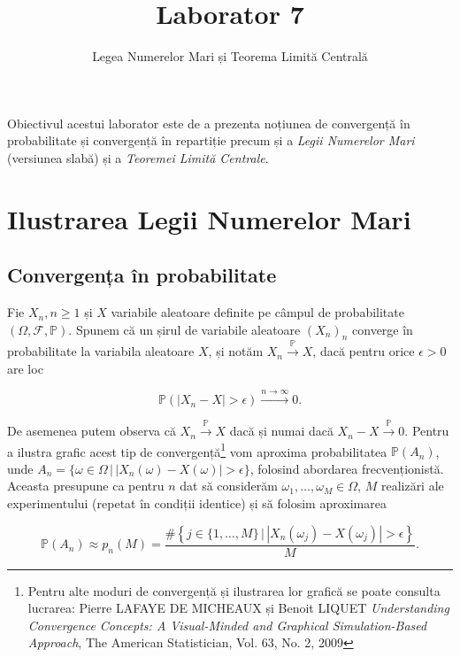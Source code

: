 \documentclass[]{article}
\title{Laborator 7}
\subtitle{Legea Numerelor Mari și Teorema Limită Centrală}
\author{}
\date{}
\let\rmarkdownfootnote\footnote%
\def\footnote{\protect\rmarkdownfootnote}
\begin{document}
\maketitle

\thispagestyle{fancy}

Obiectivul acestui laborator este de a prezenta noțiunea de convergență
în probabilitate și convergență în repartiție precum și a \emph{Legii
Numerelor Mari} (versiunea slabă) și a \emph{Teoremei Limită Centrale}.

\section{Ilustrarea Legii Numerelor
Mari}\label{ilustrarea-legii-numerelor-mari}

\subsection{Convergența în
probabilitate}\label{convergenta-in-probabilitate}

Fie \(X_n, n\geq 1\) și \(X\) variabile aleatoare definite pe câmpul de
probabilitate \((\Omega, \mathcal{F}, \mathbb{P})\). Spunem că un șirul
de variabile aleatoare \((X_n)_n\) converge în probabilitate la
variabila aleatoare \(X\), și notăm \(X_n\overset{\mathbb{P}}{\to}X\),
dacă pentru orice \(\epsilon>0\) are loc

\[
  \mathbb{P}\left(\left|X_{n} - X\right| > \epsilon\right) \overset{n\to\infty}{\longrightarrow} 0. 
\]

De asemenea putem observa că \(X_n\overset{\mathbb{P}}{\to}X\) dacă și
numai dacă \(X_n-X\overset{\mathbb{P}}{\to}0\). Pentru a ilustra grafic
acest tip de convergență\footnote{Pentru alte moduri de convergență și
  ilustrarea lor grafică se poate consulta lucrarea: Pierre LAFAYE DE
  MICHEAUX și Benoit LIQUET \emph{Understanding Convergence Concepts: A
  Visual-Minded and Graphical Simulation-Based Approach}, The American
  Statistician, Vol. 63, No. 2, 2009} vom aproxima probabilitatea
\(\mathbb{P}(A_n)\), unde
\(A_n = \{\omega\in\Omega\,|\,\left|X_{n}(\omega) - X(\omega)\right| > \epsilon\}\),
folosind abordarea frecvenționistă. Aceasta presupune ca pentru \(n\)
dat să considerăm \(\omega_1, \ldots,\omega_M\in\Omega\), \(M\)
realizări ale experimentului (repetat în condiții identice) și să
folosim aproximarea

\[
  \mathbb{P}(A_n) \approx p_n(M) = \frac{\#\left\{j\in\{1,\ldots,M\}\,|\,\left|X_{n}(\omega_j) - X(\omega_j)\right| > \epsilon\right\}}{M}.
\]
\end{document}
